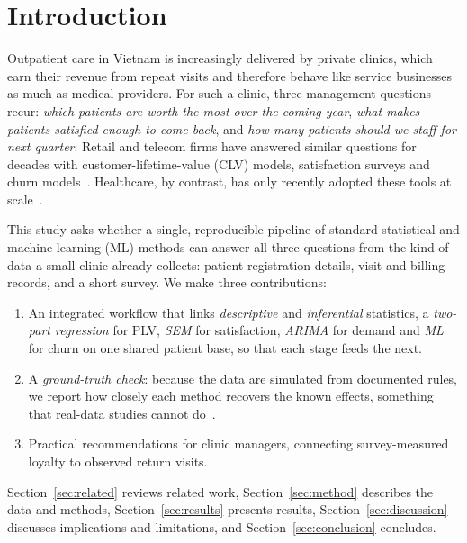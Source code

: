 \documentclass[conference]{IEEEtran}
\begin{document}
\section{Introduction}
Outpatient care in Vietnam is increasingly delivered by private clinics, which earn their revenue from repeat visits and therefore behave like service businesses as much as medical providers. For such a clinic, three management questions recur: \emph{which patients are worth the most over the coming year}, \emph{what makes patients satisfied enough to come back}, and \emph{how many patients should we staff for next quarter}. Retail and telecom firms have answered similar questions for decades with customer-lifetime-value (CLV) models, satisfaction surveys and churn models~\cite{gupta2006,reichheld1990,verbeke2012}. Healthcare, by contrast, has only recently adopted these tools at scale~\cite{raghupathi2014,rajkomar2019}.

This study asks whether a single, reproducible pipeline of standard statistical and machine-learning (ML) methods can answer all three questions from the kind of data a small clinic already collects: patient registration details, visit and billing records, and a short survey. We make three contributions:
\begin{enumerate}
\item An integrated workflow that links \emph{descriptive} and \emph{inferential} statistics, a \emph{two-part regression} for PLV, \emph{SEM} for satisfaction, \emph{ARIMA} for demand and \emph{ML} for churn on one shared patient base, so that each stage feeds the next.
\item A \emph{ground-truth check}: because the data are simulated from documented rules, we report how closely each method recovers the known effects, something that real-data studies cannot do~\cite{morris2019}.
\item Practical recommendations for clinic managers, connecting survey-measured loyalty to observed return visits.
\end{enumerate}

Section~\ref{sec:related} reviews related work, Section~\ref{sec:method} describes the data and methods, Section~\ref{sec:results} presents results, Section~\ref{sec:discussion} discusses implications and limitations, and Section~\ref{sec:conclusion} concludes.

\end{document}
